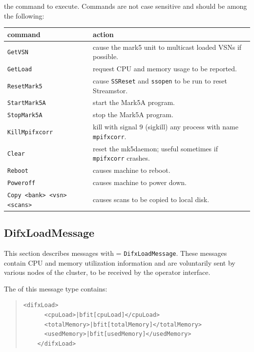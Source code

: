 \begin{description}
\item{} the command to execute.
Commands are not case sensitive and should be among the following:

\begin{tabular}{ll}
command & action\\
\hline
{\tt GetVSN} & cause the mark5 unit to multicast loaded VSNs if possible. \\
{\tt GetLoad} & request CPU and memory usage to be reported. \\
{\tt ResetMark5} & cause {\tt SSReset} and {\tt ssopen} to be run to reset Streamstor. \\
{\tt StartMark5A} & start the Mark5A program. \\
{\tt StopMark5A} & stop the Mark5A program. \\
{\tt KillMpifxcorr} & kill with signal 9 (sigkill) any process with name {\tt mpifxcorr}. \\
{\tt Clear} & reset the mk5daemon; useful sometimes if {\tt mpifxcorr} crashes. \\
{\tt Reboot} & causes machine to reboot. \\
{\tt Poweroff} & causes machine to power down. \\
{\tt Copy <bank> <vsn> <scans>} & causes scans to be copied to local disk. \\
\end{tabular}







\subsection{DifxLoadMessage}

This section describes messages with  = {\tt DifxLoadMessage}.
These messages contain CPU and memory utilization information and are voluntarily sent by various nodes of the cluster, to be received by the operator interface.

The  of this message type contains:

\begin{quotation}
\begin{Verbatim}[commandchars=\|\[\]]
    <difxLoad>
      <cpuLoad>|bfit[cpuLoad]</cpuLoad>
      <totalMemory>|bfit[totalMemory]</totalMemory>
      <usedMemory>|bfit[usedMemory]</usedMemory>
    </difxLoad>
\end{Verbatim}
\end{quotation}


\end{description}
